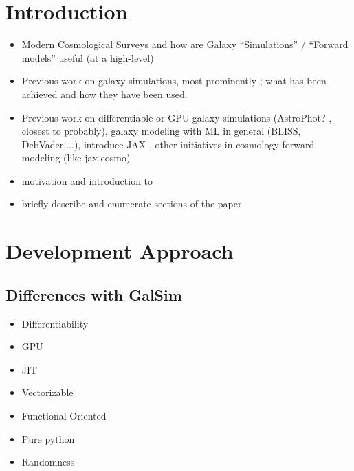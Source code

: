 \documentclass[twocolumn,twocolappendix]{openjournal}
\begin{document}
\section{Introduction} \label{sec:intro}

\begin{itemize}
    \item Modern Cosmological Surveys and how are Galaxy ``Simulations'' / ``Forward models'' useful (at a high-level)
    
    \item Previous work on galaxy simulations, most prominently \galsim \citep{galsim2015}; what has been achieved and how they have been used.
    
    \item Previous work on differentiable or GPU galaxy simulations (AstroPhot? \cite{astrophot2023}, closest to \jgalsim probably), galaxy modeling with ML in general (BLISS, DebVader,...), introduce JAX \citep{jax2018github}, other initiatives in cosmology forward modeling (like jax-cosmo)
    
    \item motivation and introduction to \jgalsim 

    \item briefly describe and enumerate sections of the paper
\end{itemize}


\section{Development Approach}

\subsection{Differences with GalSim}

\begin{itemize}
    \item Differentiability 
    \item GPU
    \item JIT 
    \item Vectorizable
    \item Functional Oriented
    \item Pure python
    \item Randomness
\end{itemize}
\end{document}
